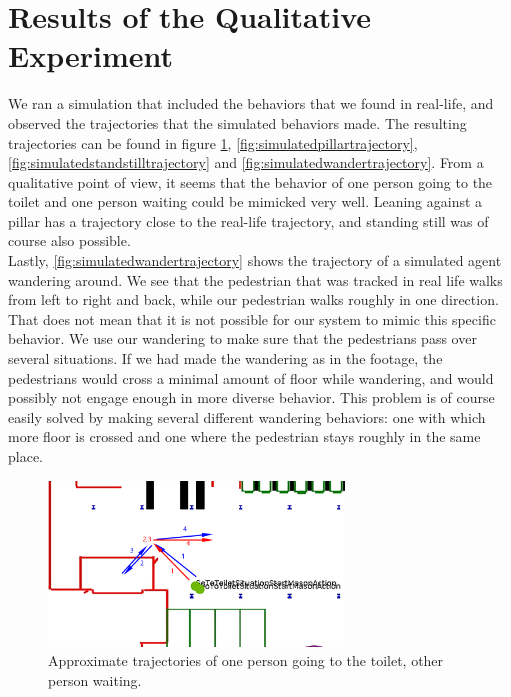 \documentclass[11pt, a4paper]{book}
\begin{document}
\section{Results of the Qualitative Experiment}
\label{sec:qualitativeresults}
We ran a simulation that included the behaviors that we found in real-life, and observed the trajectories that the simulated behaviors made. The resulting trajectories can be found in figure \ref{fig:simulatedtoilettrajectory}, \ref{fig:simulatedpillartrajectory}, \ref{fig:simulatedstandstilltrajectory} and \ref{fig:simulatedwandertrajectory}. From a qualitative point of view, it seems that the behavior of one person going to the toilet and one person waiting could be mimicked very well. Leaning against a pillar has a trajectory close to the real-life trajectory, and standing still was of course also possible.\\
Lastly, \ref{fig:simulatedwandertrajectory} shows the trajectory of a simulated agent wandering around. We see that the pedestrian that was tracked in real life walks from left to right and back, while our pedestrian walks roughly in one direction. That does not mean that it is not possible for our system to mimic this specific behavior. We use our wandering to make sure that the pedestrians pass over several situations. If we had made the wandering as in the footage, the pedestrians would cross a minimal amount of floor while wandering, and would possibly not engage enough in more diverse behavior. This problem is of course easily solved by making several different wandering behaviors: one with which more floor is crossed and one where the pedestrian stays roughly in the same place.
\begin{figure}[h!]
\centering
\includegraphics[width=0.7\textwidth]{"./qualitative experiment pictures/simulated_gototoilet_cropped"}
\caption{Approximate trajectories of one person going to the toilet, other person waiting.}
\label{fig:simulatedtoilettrajectory}
\end{figure}
\end{document}
